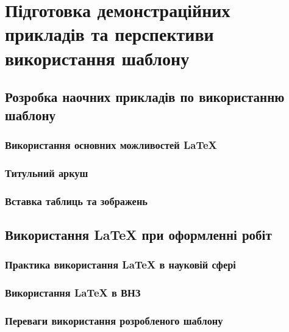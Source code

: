 \chapter{Підготовка демонстраційних прикладів та перспективи використання шаблону} 
\label{chap:first}
%
%
%
%
%
\section{Розробка наочних прикладів по використанню шаблону}
%
%
\subsection{Використання основних можливостей \LaTeX{}}
%
%
\subsection{Титульний аркуш}
%
%
\subsection{Вставка таблиць та зображень}
%
%
%
%
%
\section{Використання \LaTeX{} при оформленні робіт}
%
%
\subsection{Практика використання \LaTeX{} в науковій сфері}
%
%
\subsection{Використання \LaTeX{} в ВНЗ}
%
%
\subsection{Переваги використання розробленого шаблону}
